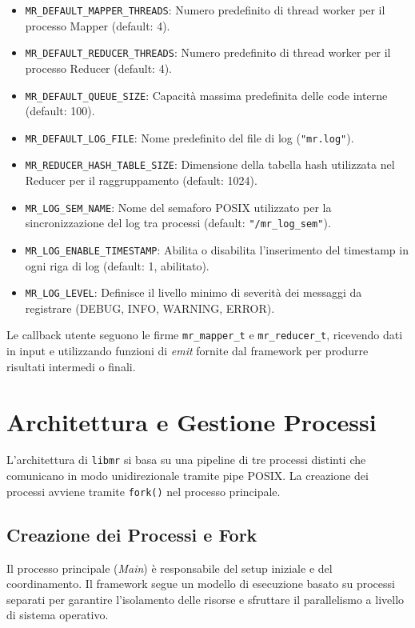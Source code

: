 \documentclass[12pt,a4paper]{article}
\begin{document}
\begin{itemize}
    \item \texttt{MR\_DEFAULT\_MAPPER\_THREADS}: Numero predefinito di thread worker per il processo Mapper (default: 4).
    \item \texttt{MR\_DEFAULT\_REDUCER\_THREADS}: Numero predefinito di thread worker per il processo Reducer (default: 4).
    \item \texttt{MR\_DEFAULT\_QUEUE\_SIZE}: Capacità massima predefinita delle code interne (default: 100).
    \item \texttt{MR\_DEFAULT\_LOG\_FILE}: Nome predefinito del file di log (\texttt{"mr.log"}).
    \item \texttt{MR\_REDUCER\_HASH\_TABLE\_SIZE}: Dimensione della tabella hash utilizzata nel Reducer per il raggruppamento (default: 1024).
    \item \texttt{MR\_LOG\_SEM\_NAME}: Nome del semaforo POSIX utilizzato per la sincronizzazione del log tra processi (default: \texttt{"/mr\_log\_sem"}).
    \item \texttt{MR\_LOG\_ENABLE\_TIMESTAMP}: Abilita o disabilita l'inserimento del timestamp in ogni riga di log (default: 1, abilitato).
    \item \texttt{MR\_LOG\_LEVEL}: Definisce il livello minimo di severità dei messaggi da registrare (DEBUG, INFO, WARNING, ERROR).
\end{itemize}

Le callback utente seguono le firme \texttt{mr\_mapper\_t} e \texttt{mr\_reducer\_t}, ricevendo dati in input e utilizzando funzioni di \textit{emit} fornite dal framework per produrre risultati intermedi o finali.

\section{Architettura e Gestione Processi}
L'architettura di \texttt{libmr} si basa su una pipeline di tre processi distinti che comunicano in modo unidirezionale tramite pipe POSIX. La creazione dei processi avviene tramite \texttt{fork()} nel processo principale.

\subsection{Creazione dei Processi e Fork}
Il processo principale (\textit{Main}) è responsabile del setup iniziale e del coordinamento. Il framework segue un modello di esecuzione basato su processi separati per garantire l'isolamento delle risorse e sfruttare il parallelismo a livello di sistema operativo.
\end{document}
